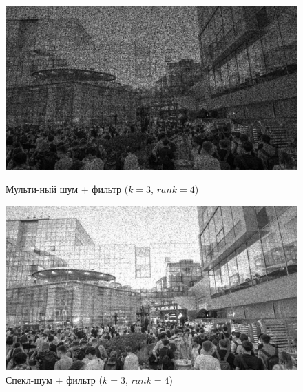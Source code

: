 \documentclass[a4paper]{article}
\begin{document}
\begin{figure}[H]
    \begin{minipage}{0.49\textwidth}
        \centering \includegraphics[width=\textwidth]{images/3_nonlinear_filters/multiplicative - rang (k=3, rank=4).jpg}
        \caption{Мульти-ный шум + фильтр ($k = 3$, $rank = 4$)}
    \end{minipage}\hfill
    \begin{minipage}{0.49\textwidth}
        \centering \includegraphics[width=\textwidth]{images/3_nonlinear_filters/speckle - rang (k=3, rank=4).jpg}
        \caption{Спекл-шум + фильтр ($k = 3$, $rank = 4$)}
    \end{minipage}
\end{figure}
\end{document}
